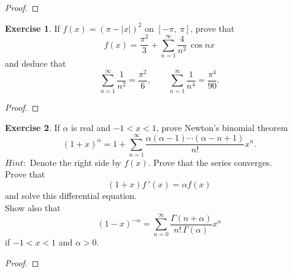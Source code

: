 \documentclass[12pt]{book}
\theoremstyle{definition}
\newtheorem{exe}{Exercise}
\begin{document}
	\begin{proof}
	\end{proof}
	\newpage
	\begin{exe}
		If $f(x)=(\pi-|x|)^2$ on $[-\pi,~\pi]$, prove that $$f(x)=\dfrac{\pi^2}{3}+\displaystyle\sum_{n=1}^\infty \dfrac{4}{n^2}\,\cos nx$$ and deduce that $$\displaystyle\sum_{n=1}^\infty \dfrac{1}{n^2}=\dfrac{\pi^2}{6},\qquad \sum_{n=1}^{\infty} \dfrac{1}{n^4}=\dfrac{\pi^4}{90}.$$
	\end{exe}
	\begin{proof}
	\end{proof}
	\newpage
	\setcounter{exe}{21}
	\begin{exe}
		If $\alpha$ is real and $-1<x<1$, prove Newton's binomial theorem $$(1+x)^\alpha=1+\displaystyle\sum_{n=1}^\infty \dfrac{\alpha(\alpha-1)\cdots(\alpha-n+1)}{n!}x^n.$$
		$Hint:$ Denote the right side by $f(x)$. Prove that the series converges.\\
		Prove that $$(1+x)f\,'(x)=\alpha f(x)$$ and solve this differential equation.\\
		Show also that $$(1-x)^{-\alpha}=\displaystyle\sum_{n=0}^\infty \dfrac{\Gamma(n+\alpha)}{n!\,\Gamma(\alpha)} x^n$$ if $-1<x<1$ and $\alpha>0$.
	\end{exe}
	\begin{proof}
	\end{proof}
\end{document}
